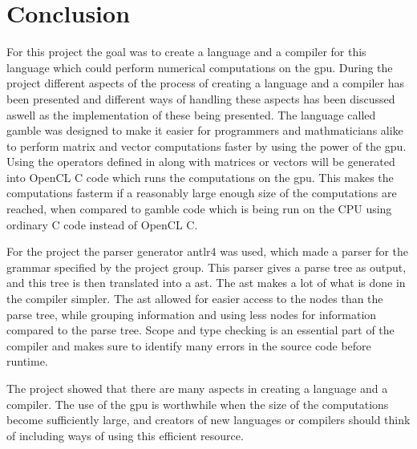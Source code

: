 \chapter{Conclusion} %
\label{cha:conclusion}
For this project the goal was to create a language and a compiler for this language which could perform numerical computations on the gpu.
During the project different aspects of the process of creating a language and a compiler has been presented and different ways of handling these aspects has been discussed aswell as the implementation of these being presented.
The language called \gls{gamble} was designed to make it easier for programmers and mathmaticians alike to perform matrix and vector computations faster by using the power of the \acrshort{gpu}.
Using the operators defined in  along with matrices or vectors will be generated into OpenCL C code which runs the computations on the \acrshort{gpu}.
This makes the computations fasterm if a reasonably large enough size of the computations are reached, when compared to \gls{gamble} code which is being run on the CPU using ordinary C code instead of OpenCL C.

For the project the parser generator \acrshort{antlr}4 was used, which made a parser for the grammar specified by the project group.
This parser gives a parse tree as output, and this tree is then translated into a \acrshort{ast}.
The \acrshort{ast} makes a lot of what is done in the compiler simpler.
The \acrshort{ast} allowed for easier access to the nodes than the parse tree, while grouping information and using less nodes for information compared to the parse tree.
Scope and type checking is an essential part of the compiler and makes sure to identify many errors in the source code before runtime.

The project showed that there are many aspects in creating a language and a compiler.
The use of the \acrshort{gpu} is worthwhile when the size of the computations become sufficiently large, and creators of new languages or compilers should think of including ways of using this efficient resource.